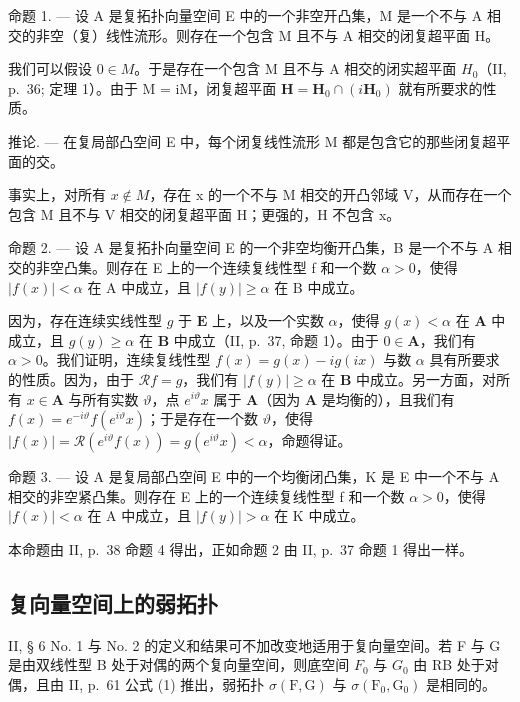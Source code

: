 命题 1. --- 设 A 是复拓扑向量空间 E 中的一个非空开凸集，M 是一个不与 A 相交的非空（复）线性流形。则存在一个包含 M 且不与 A 相交的闭复超平面 H。

我们可以假设 \(0 \in M\)。于是存在一个包含 M 且不与 A 相交的闭实超平面 \(H_{0}\)（II, p.~36; 定理 1）。由于 M = iM，闭复超平面 \(\mathbf{H} = \mathbf{H}_{0} \cap (i\mathbf{H}_{0})\) 就有所要求的性质。

推论. --- 在复局部凸空间 E 中，每个闭复线性流形 M 都是包含它的那些闭复超平面的交。

事实上，对所有 \(x \notin M\)，存在 x 的一个不与 M 相交的开凸邻域 V，从而存在一个包含 M 且不与 V 相交的闭复超平面 H；更强的，H 不包含 x。

命题 2. --- 设 A 是复拓扑向量空间 E 的一个非空均衡开凸集，B 是一个不与 A 相交的非空凸集。则存在 E 上的一个连续复线性型 f 和一个数 \(\alpha > 0\)，使得 \(|f(x)| < \alpha\) 在 A 中成立，且 \(|f(y)| \geqslant \alpha\) 在 B 中成立。

因为，存在连续实线性型 \(g\) 于 \(\mathbf{E}\) 上，以及一个实数 \(\alpha\)，使得 \(g(x) < \alpha\) 在 \(\mathbf{A}\) 中成立，且 \(g(y) \geqslant \alpha\) 在 \(\mathbf{B}\) 中成立（II, p.~37, 命题 1）。由于 \(0 \in \mathbf{A}\)，我们有 \(\alpha > 0\)。我们证明，连续复线性型 \(f(x) = g(x) - ig(ix)\) 与数 \(\alpha\) 具有所要求的性质。因为，由于 \(\mathcal{R}f = g\)，我们有 \(|f(y)| \geqslant \alpha\) 在 \(\mathbf{B}\) 中成立。另一方面，对所有 \(x \in \mathbf{A}\) 与所有实数 \(\vartheta\)，点 \(e^{i\vartheta}x\) 属于 \(\mathbf{A}\)（因为 \(\mathbf{A}\) 是均衡的），且我们有 \(f(x) = e^{-i\vartheta}f(e^{i\vartheta}x)\)；于是存在一个数 \(\vartheta\)，使得 \(|f(x)| = \mathcal{R}(e^{i\vartheta}f(x)) = g(e^{i\vartheta}x) < \alpha\)，命题得证。

命题 3. --- 设 A 是复局部凸空间 E 中的一个均衡闭凸集，K 是 E 中一个不与 A 相交的非空紧凸集。则存在 E 上的一个连续复线性型 f 和一个数 \(\alpha > 0\)，使得 \(|f(x)| < \alpha\) 在 A 中成立，且 \(|f(y)| > \alpha\) 在 K 中成立。

本命题由 II, p.~38 命题 4 得出，正如命题 2 由 II, p.~37 命题 1 得出一样。

\subsection{复向量空间上的弱拓扑}

II, § 6 No. 1 与 No. 2 的定义和结果可不加改变地适用于复向量空间。若 F 与 G 是由双线性型 B 处于对偶的两个复向量空间，则底空间 \(F_{0}\) 与 \(G_{0}\) 由 RB 处于对偶，且由 II, p.~61 公式 (1) 推出，弱拓扑 \(\sigma(\mathrm{F},\mathrm{G})\) 与 \(\sigma(\mathrm{F}_{0},\mathrm{G}_{0})\) 是相同的。

